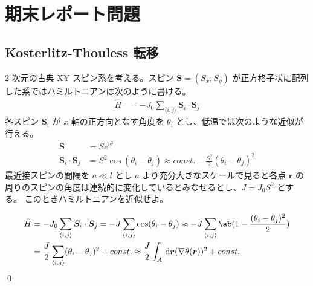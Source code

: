 \documentclass[uplatex,dvipdfmx,a4paper,11pt]{jlreq}
\makeatletter
\renewcommand{\SS}{\bm{S}}
\newcommand{\rr}{\bm{r}}
\newcommand{\vnabla}{\mathbf{\nabla}}
\numberwithin{equation}{section}
\theoremstyle{definition}
\renewenvironment{proof}[1][\proofname]{\par
  \normalfont
  \topsep6\p@\@plus6\p@ \trivlist
  \item[\hskip\labelsep{\bfseries #1}\@addpunct{\bfseries}]\ignorespaces\quad\par
}{%
  \qed\endtrivlist\@endpefalse
}
\renewcommand\proofname{証明}
\makeatother
\begin{document}
\setcounter{section}{6}
\section{期末レポート問題}
\subsection{Kosterlitz-Thouless 転移}
\begin{problem}
2 次元の古典 XY スピン系を考える。スピン $\SS = (S_x, S_y)$ が正方格子状に配列した系ではハミルトニアンは次のように書ける。
\begin{align}
  \hat{H} & = -J_0\sum_{\langle i,j\rangle}\SS_i\cdot\SS_j
\end{align}
各スピン $\SS_i$ が $x$ 軸の正方向となす角度を $\theta_i$ とし、低温では次のような近似が行える。
\begin{align}
  \SS             & = Se^{i\theta}                                                                       \\
  \SS_i\cdot\SS_j & = S^2\cos(\theta_i - \theta_j) \approx const. - \frac{S^2}{2}(\theta_i - \theta_j)^2
\end{align}
最近接スピンの間隔を $a \ll l$ とし $a$ より充分大きなスケールで見ると各点 $\rr$ の周りのスピンの角度は連続的に変化しているとみなせるとし、$J = J_0S^2$ とする。
このときハミルトニアンを近似せよ。
\end{problem}
\begin{proof}
  \begin{align}
    \hat{H} & = -J_0\sum_{\langle i,j\rangle}\SS_i\cdot\SS_j = -J\sum_{\langle i,j\rangle}\cos(\theta_i - \theta_j) \approx -J\sum_{\langle i,j\rangle}\ab(1 - \frac{(\theta_i - \theta_j)^2}{2}) \\
            & = \frac{J}{2}\sum_{\langle i,j\rangle}(\theta_i - \theta_j)^2 + const. \approx \frac{J}{2}\int_A\dl{\rr} (\vnabla\theta(\rr))^2 + const.
  \end{align}
\end{proof}
\end{document}
